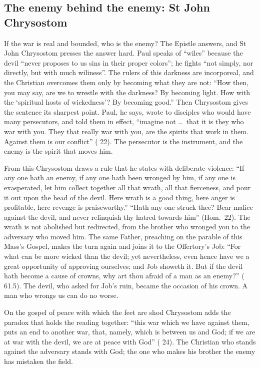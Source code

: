 \subsection{The enemy behind the enemy: St John Chrysostom}

If the war is real and bounded, who is the enemy? The Epistle answers, and St
John Chrysostom presses the answer hard. Paul speaks of ``wiles'' because the
devil ``never proposes to us sins in their proper colors''; he fights ``not
simply, nor directly, but with much wiliness''. The rulers of this darkness are
incorporeal, and the Christian overcomes them only by becoming what they are not:
``How then, you may say, are we to wrestle with the darkness? By becoming light.
How with the `spiritual hosts of wickedness'? By becoming good.'' Then Chrysostom
gives the sentence its sharpest point. Paul, he says, wrote to disciples who
would have many persecutors, and told them in effect, ``imagine not \dots\ that
it is they who war with you. They that really war with you, are the spirits that
work in them. Against them is our conflict'' ( 22).
The persecutor is the instrument, and the enemy is the spirit that moves him.

From this Chrysostom draws a rule that he states with deliberate violence: ``If
any one hath an enemy, if any one hath been wronged by him, if any one is
exasperated, let him collect together all that wrath, all that fierceness, and
pour it out upon the head of the devil. Here wrath is a good thing, here anger is
profitable, here revenge is praiseworthy.'' ``Hath any one struck thee? Bear
malice against the devil, and never relinquish thy hatred towards him'' (Hom.\
22). The wrath is not abolished but redirected, from the brother who wronged
you to the adversary who moved him. The same Father, preaching on the parable of
this Mass's Gospel, makes the turn again and joins it to the Offertory's Job: ``For
what can be more wicked than the devil; yet nevertheless, even hence have we a
great opportunity of approving ourselves; and Job showeth it. But if the devil
hath become a cause of crowns, why art thou afraid of a man as an enemy?''
(\work{Homilies on Matthew} 61.5). The devil, who asked for Job's ruin, became the
occasion of his crown. A man who wrongs us can do no worse.

On the gospel of peace with which the feet are shod Chrysostom adds the paradox
that holds the reading together: ``this war which we have against them, puts an
end to another war, that, namely, which is between us and God; if we are at war
with the devil, we are at peace with God'' (\work{Homilies on Ephesians} 24). The
Christian who stands against the adversary stands with God; the one who makes his
brother the enemy has mistaken the field.

